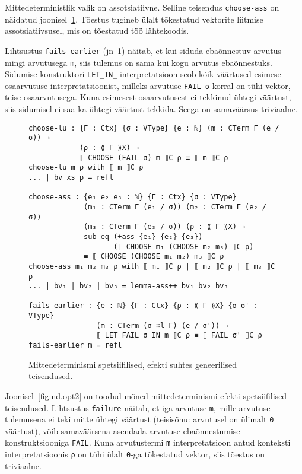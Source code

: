\documentclass[a4paper,12pt]{article}
\begin{document}
Mittedeterministlik valik on assotsiatiivne. Selline teisendus {\tt choose-ass} on näidatud joonisel~\ref{fig:nd.opt1}. Tõestus tugineb ülalt tõkestatud vektorite liitmise assotsiatiivsusel, mis on tõestatud töö lähtekoodis.

Lihtsustus {\tt fails-earlier} (jn~\ref{fig:nd.opt1}) näitab, et kui siduda ebaõnnestuv arvutus mingi arvutusega {\tt m}, siis tulemus on sama kui kogu arvutus ebaõnnestuks. Sidumise konstruktori {\tt LET_IN_} interpretatsioon seob kõik väärtused esimese osaarvutuse interpretatsioonist, milleks arvutuse {\tt FAIL σ} korral on tühi vektor, teise osaarvutusega. Kuna esimesest osaarvutusest ei tekkinud ühtegi väärtust, siis sidumisel ei saa ka ühtegi väärtust tekkida. Seega on samaväärsus triviaalne.
\begin{figure}
  \begin{BVerbatim}
choose-lu : {Γ : Ctx} {σ : VType} {e : ℕ} (m : CTerm Γ (e / σ)) →
            (ρ : ⟪ Γ ⟫X) → 
            ⟦ CHOOSE (FAIL σ) m ⟧C ρ ≡ ⟦ m ⟧C ρ
choose-lu m ρ with ⟦ m ⟧C ρ
... | bv xs p = refl

choose-ass : {e₁ e₂ e₃ : ℕ} {Γ : Ctx} {σ : VType}
             (m₁ : CTerm Γ (e₁ / σ)) (m₂ : CTerm Γ (e₂ / σ))
             (m₃ : CTerm Γ (e₃ / σ)) (ρ : ⟪ Γ ⟫X) →
             sub-eq (+ass {e₁} {e₂} {e₃})
                    (⟦ CHOOSE m₁ (CHOOSE m₂ m₃) ⟧C ρ)
             ≡ ⟦ CHOOSE (CHOOSE m₁ m₂) m₃ ⟧C ρ
choose-ass m₁ m₂ m₃ ρ with ⟦ m₁ ⟧C ρ | ⟦ m₂ ⟧C ρ | ⟦ m₃ ⟧C ρ
... | bv₁ | bv₂ | bv₃ = lemma-ass++ bv₁ bv₂ bv₃

fails-earlier : {e : ℕ} {Γ : Ctx} {ρ : ⟪ Γ ⟫X} {σ σ' : VType}
                (m : CTerm (σ ∷l Γ) (e / σ')) →
                ⟦ LET FAIL σ IN m ⟧C ρ ≡ ⟦ FAIL σ' ⟧C ρ
fails-earlier m = refl
  \end{BVerbatim}
  \caption{Mittedeterminismi spetsiifilised, efekti suhtes geneerilised teisendused.}
  \label{fig:nd.opt1}
\end{figure}

Joonisel~\ref{fig:nd.opt2} on toodud mõned mittedeterminismi efekti-spetsiifilised teisendused. Lihtsustus {\tt failure} näitab, et iga arvutuse {\tt m}, mille arvutuse tulemusena ei teki mitte ühtegi väärtust (teisisõnu: arvutusel on ülimalt {\tt 0} väärtust), võib samaväärsena asendada arvutuse ebaõnnestumise konstruktsiooniga {\tt FAIL}. Kuna arvutustermi {\tt m} interpretatsioon antud konteksti interpretatsioonis {\tt ρ} on tühi ülalt {\tt 0}-ga tõkestatud vektor, siis tõestus on triviaalne.
\end{document}
